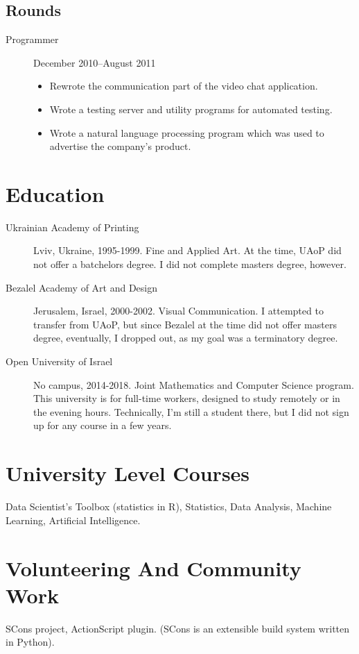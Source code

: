 \documentclass[11pt]{article}
\begin{document}
\subsection*{Rounds}
\label{sec:org0c41e5b}
\begin{description}
\item[{Programmer}] December 2010--August 2011
\begin{itemize}
\item Rewrote the communication part of the video chat application.
\item Wrote a testing server and utility programs for automated
testing.
\item Wrote a natural language processing program which was used
to advertise the company's product.
\end{itemize}
\end{description}

\section*{Education}
\label{sec:orge29bc54}
\begin{description}
\item[{Ukrainian Academy of Printing}] Lviv, Ukraine, 1995-1999.  Fine
and Applied Art.  At the time, UAoP did not offer a batchelors
degree.  I did not complete masters degree, however.
\item[{Bezalel Academy of Art and Design}] Jerusalem, Israel, 2000-2002.
Visual Communication.  I attempted to transfer from UAoP, but
since Bezalel at the time did not offer masters degree,
eventually, I dropped out, as my goal was a terminatory degree.
\item[{Open University of Israel}] No campus, 2014-2018.  Joint
Mathematics and Computer Science program.  This university is
for full-time workers, designed to study remotely or in the
evening hours.  Technically, I'm still a student there, but I
did not sign up for any course in a few years.
\end{description}
\section*{University Level Courses}
\label{sec:org5b3c00d}
Data Scientist's Toolbox (statistics in R), Statistics, Data
Analysis, Machine Learning, Artificial Intelligence.

\section*{Volunteering And Community Work}
\label{sec:org40dc152}
SCons project, ActionScript plugin.  (SCons is an extensible build system
written in Python).
\end{document}
